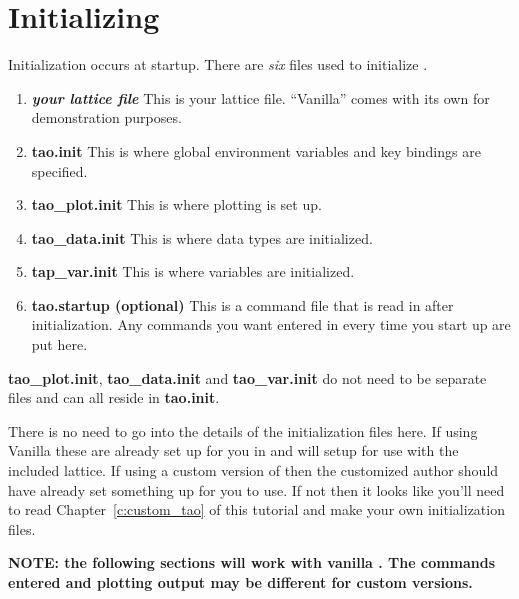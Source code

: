 \section{Initializing \tao}
\label{s:initializing}

Initialization occurs at startup. There are \emph{six} files used to initialize \tao.
  \vspace*{-3ex}
\begin{enumerate}
  \item \textbf{\textit{your lattice file}} \Newline
    This is your lattice file. ``Vanilla'' \tao comes with its own for
demonstration purposes.
  \item \textbf{tao.init} \Newline 
    This is where global environment variables and key bindings are specified.
  \item \textbf{tao\_plot.init} \Newline
    This is where plotting is set up.
  \item \textbf{tao\_data.init} \Newline
    This is where data types are initialized.
  \item \textbf{tap\_var.init} \Newline
    This is where variables are initialized.
  \item \textbf{tao.startup (optional)} \Newline
    This is a command file that is read in after initialization. Any commands you
want entered in \tao every time you start up are put here.
\end{enumerate}
\textbf{tao\_plot.init}, \textbf{tao\_data.init} and \textbf{tao\_var.init} do
not need to be separate files and can all reside in \textbf{tao.init}.

There is no need to go into the details of the initialization files here. If
using Vanilla \tao these are already set up for you in  and
will setup \tao for use with the included \cesr lattice. If using a custom
version of \tao then the customized \tao author should have already set
something up for you to use. If not then it looks like you'll need to read
Chapter~\ref{c:custom_tao} of this tutorial and make your own initialization
files.

\textbf{NOTE: the following sections will work with vanilla \tao. The commands
entered and plotting output may be different for custom versions.}


